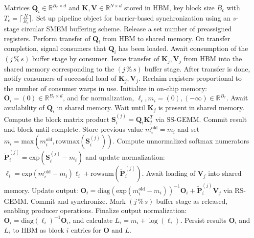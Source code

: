 \begin{enumerate}
\begin{algorithm}[H]
    \caption{\small\label{alg:flash3_wgmma_ws_only}\textsc{FlashAttention-3} forward computation \textbf{excluding} intra-consumer overlap -- CTA perspective}
    \begin{algorithmic}[1]
\REQUIRE Matrices $\mathbf{Q}_i \in \mathbb{R}^{B_r \times d}$ and $\mathbf{K}, \mathbf{V} \in \mathbb{R}^{N \times d}$ stored in HBM, key block size $B_c$ with $T_c = \lceil \frac{N}{B_c} \rceil$.
\STATE Set up pipeline object for barrier-based synchronization using an $s$-stage circular SMEM buffering scheme.
\STATE Release a set number of preassigned registers.
\STATE Perform transfer of $\mathbf{Q}_i$ from HBM to shared memory.
\STATE On transfer completion, signal consumers that $\mathbf{Q}_i$ has been loaded.
    \STATE Await consumption of the $(j\,\%\,s)$ buffer stage by consumer.
    \STATE Issue transfer of $\mathbf{K}_j, \mathbf{V}_j$ from HBM into the shared memory corresponding to the $(j\,\%\,s)$ buffer stage.
    \STATE After transfer is done, notify consumers of successful load of $\mathbf{K}_j, \mathbf{V}_j$.
\ENDFOR
\ELSE \STATE Reclaim registers proportional to the number of consumer warps in use.
\STATE Initialize in on-chip memory: $\mathbf{O}_i = (0) \in \mathbb{R}^{B_r \times d}$, and for normalization, $\ell_i, m_i = (0), (-\infty) \in \mathbb{R}^{B_r}$.
\STATE Await availability of $\mathbf{Q}_i$ in shared memory.
\STATE Wait until $\mathbf{K}_j$ is present in shared memory.
\STATE Compute the block matrix product $\mathbf{S}_i^{(j)} = \mathbf{Q}_i \mathbf{K}_j^T$ via SS-GEMM. Commit result and block until complete. \label{alg:ws_only_gemm1}
\STATE Store previous value $m_i^{\mathrm{old}} = m_i$ and set $m_i = \mathrm{max}(m_i^{\mathrm{old}}, \mathrm{rowmax}(\mathbf{S}_i^{(j)}))$. \label{code-ws:softmax_start}
\STATE Compute unnormalized softmax numerators $\widetilde{\mathbf{P}}_i^{(j)} = \mathrm{exp}(\mathbf{S}_i^{(j)} - m_i)$ and update normalization: $\ell_i = \mathrm{exp}(m_i^{\mathrm{old}} - m_i) \ell_i + \mathrm{rowsum}(\widetilde{\mathbf{P}}_i^{(j)})$. \label{code-ws:softmax_end}
\STATE Await loading of $\mathbf{V}_j$ into shared memory.
\STATE Update output: $\mathbf{O}_i = \mathrm{diag}(\mathrm{exp}(m_i^{\mathrm{old}} - m_i))^{-1} \mathbf{O}_i + \widetilde{\mathbf{P}}_i^{(j)} \mathbf{V}_j$ via RS-GEMM. Commit and synchronize. \label{alg:ws_only_gemm2}
\STATE Mark $(j\,\%\,s)$ buffer stage as released, enabling producer operations.
\ENDFOR
\STATE Finalize output normalization: $\mathbf{O}_i = \mathrm{diag}(\ell_i)^{-1} \mathbf{O}_i$, and calculate $L_i = m_i + \log(\ell_i)$.
\STATE Persist results $\mathbf{O}_i$ and $L_i$ to HBM as block $i$ entries for $\mathbf{O}$ and $L$.
\ENDIF
\end{algorithmic}
\end{algorithm}


\end{enumerate}
